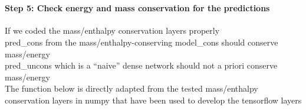\documentclass[11pt]{article}
\begin{document}
    \begin{center}
    \end{center}
    { \hspace*{\fill} \\}
    
    \hypertarget{step-5-check-energy-and-mass-conservation-for-the-predictions}{%
\paragraph{Step 5: Check energy and mass conservation for the
predictions}\label{step-5-check-energy-and-mass-conservation-for-the-predictions}}

If we coded the mass/enthalpy conservation layers properly\\
pred\_cons from the mass/enthalpy-conserving model\_cons should conserve
mass/energy\\
pred\_uncons which is a ``naive'' dense network should not a priori
conserve mass/energy\\
The function below is directly adapted from the tested mass/enthalpy
conservation layers in numpy that have been used to develop the
tensorflow layers
\end{document}
